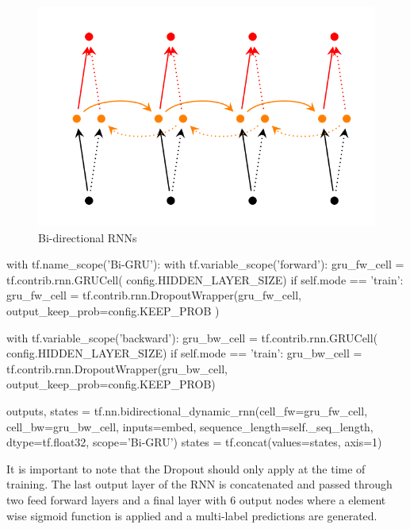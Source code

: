 \documentclass{article}
\begin{document}
    \begin{figure}[H]
        \centering
        \includegraphics[scale=0.6]{bi_rnn.png}
        \caption{Bi-directional RNNs}
        \label{figure:bi-rnn}
    \end{figure}



    \begin{python}
    with tf.name_scope('Bi-GRU'):
    with tf.variable_scope('forward'):
        gru_fw_cell = tf.contrib.rnn.GRUCell(
            config.HIDDEN_LAYER_SIZE)
        if self.mode == 'train':
            gru_fw_cell = tf.contrib.rnn.DropoutWrapper(gru_fw_cell,
            output_keep_prob=config.KEEP_PROB )

    with tf.variable_scope('backward'):
        gru_bw_cell = tf.contrib.rnn.GRUCell(
            config.HIDDEN_LAYER_SIZE)
        if self.mode == 'train':
            gru_bw_cell = tf.contrib.rnn.DropoutWrapper(gru_bw_cell,
            output_keep_prob=config.KEEP_PROB)

        outputs, states = tf.nn.bidirectional_dynamic_rnn(cell_fw=gru_fw_cell,
                                                    cell_bw=gru_bw_cell,
                                                    inputs=embed,
                                                    sequence_length=self._seq_length,
                                                    dtype=tf.float32,
                                                    scope='Bi-GRU')
    states = tf.concat(values=states, axis=1)
    \end{python}

    It is important to note that the Dropout should only apply at the time of training. The last output layer of the RNN is concatenated and passed through two feed forward layers and a final layer with $6$ output nodes where a element wise sigmoid function is applied and a multi-label predictions are generated.
\end{document}
